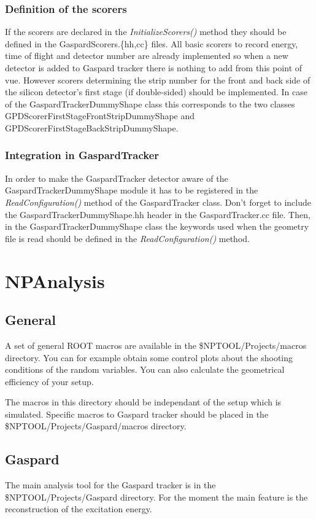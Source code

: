 \documentclass[a4paper,12pt]{article}
\begin{document}
\subsubsection{Definition of the scorers}
If the scorers are declared in the {\it InitializeScorers()} method they should
be defined in the GaspardScorers.\{hh,cc\} files. All basic scorers to record
energy, time of flight and detector number are already implemented so when a new
detector is added to Gaspard tracker there is nothing to add from this point
of vue. However scorers determining the strip number for the front and back
side of the silicon detector's first stage (if double-sided) should be implemented.
In case of the GaspardTrackerDummyShape class this corresponds to the two classes
GPDScorerFirstStageFrontStripDummyShape and GPDScorerFirstStageBackStripDummyShape.

\subsubsection{Integration in GaspardTracker}
In order to make the GaspardTracker detector aware of the GaspardTrackerDummyShape
module it has to be registered in the {\it ReadConfiguration()} method of the 
GaspardTracker class. Don't forget to include the GaspardTrackerDummyShape.hh 
header in the GaspardTracker.cc file. Then, in the GaspardTrackerDummyShape class 
the keywords used when the geometry file is read should be defined in the {\it 
ReadConfiguration()} method.


\section{NPAnalysis}
\subsection{General}
A set of general ROOT macros are available in the \$NPTOOL/Projects/macros 
directory. You can for example obtain some control plots about the shooting
conditions of the random variables. You can also calculate the geometrical 
efficiency of your setup.

The macros in this directory should be independant of the setup which is simulated.
Specific macros to Gaspard tracker should be placed in the 
\$NPTOOL/Projects/Gaspard/macros directory.


\subsection{Gaspard}
The main analysis tool for the Gaspard tracker is in the \$NPTOOL/Projects/Gaspard
directory. For the moment the main feature is the reconstruction of the excitation 
energy.
\end{document}
